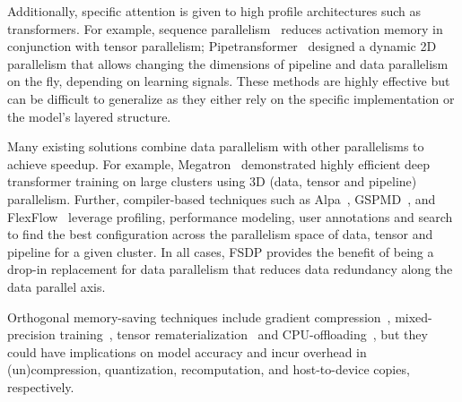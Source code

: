 Additionally, specific attention is given to high profile architectures such as transformers. For example, sequence parallelism~\cite{sequence} reduces activation memory in conjunction with tensor parallelism; Pipetransformer~\cite{pipetransformer} designed a dynamic 2D parallelism that allows changing the dimensions of pipeline and data parallelism on the fly, depending on learning signals. These methods are highly effective but can be difficult to generalize as they either rely on the specific implementation or the model's layered structure.

Many existing solutions combine data parallelism with other parallelisms to achieve speedup. For example, Megatron~\cite{narayanan2021efficient} demonstrated highly efficient deep transformer training on large clusters using 3D (data, tensor and pipeline) parallelism. Further, compiler-based techniques such as Alpa~\cite{zheng2022alpa}, GSPMD~\cite{gspmd}, and FlexFlow~\cite{flexflow} leverage profiling, performance modeling, user annotations and search to find the best configuration across the parallelism space of data, tensor and pipeline for a given cluster. In all cases, FSDP provides the benefit of being a drop-in replacement for data parallelism that reduces data redundancy along the data parallel axis.



Orthogonal memory-saving techniques include gradient compression~\cite{compression}, mixed-precision training~\cite{precision}, tensor rematerialization~\cite{DTR} and CPU-offloading~\cite{fang2022parallel}, but they could have implications on model accuracy and incur overhead in (un)compression, quantization, recomputation, and host-to-device copies, respectively.